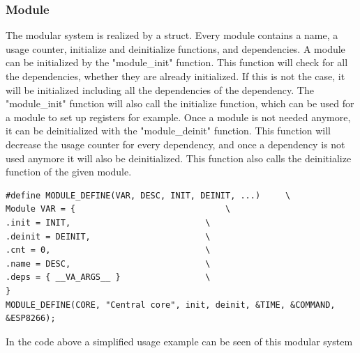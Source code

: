 \subsubsection{Module}
The modular system is realized by a struct. Every module contains a name, a usage counter, initialize and deinitialize functions, and dependencies. A module can be initialized by the "module\_init" function. This function will check for all the dependencies, whether they are already initialized. If this is not the case, it will be initialized including all the dependencies of the dependency. The "module\_init" function will also call the initialize function, which can be used for a module to set up registers for example. Once a module is not needed anymore, it can be deinitialized with the "module\_deinit" function. This function will decrease the usage counter for every dependency, and once a dependency is not used anymore it will also be deinitialized. This function also calls the deinitialize function of the given module.

\begin{verbatim}
#define MODULE_DEFINE(VAR, DESC, INIT, DEINIT, ...)     \
Module VAR = {                          	\
.init = INIT,                           \
.deinit = DEINIT,                       \
.cnt = 0,                               \
.name = DESC,                           \
.deps = { __VA_ARGS__ }                 \
} 
MODULE_DEFINE(CORE, "Central core", init, deinit, &TIME, &COMMAND, &ESP8266);
\end{verbatim}
In the code above a simplified usage example can be seen of this modular system

